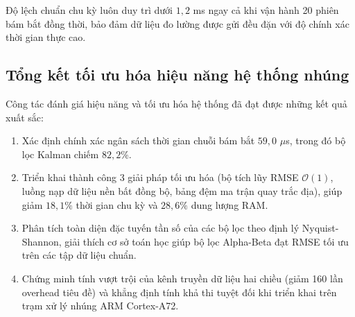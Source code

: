 \begin{table}[H]
\centering
\caption{Đo đạc độ chính xác chu kỳ trích mẫu 10 Hz và độ giật thời gian (Jitter) trên máy chủ kiểm thử}
\label{tab:event-loop-jitter-benchmark-w12}
\end{table}

Độ lệch chuẩn chu kỳ luôn duy trì dưới $1{,}2$ ms ngay cả khi vận hành 20 phiên bám bắt đồng thời, bảo đảm dữ liệu đo lường được gửi đều đặn với độ chính xác thời gian thực cao.

\subsection{Tổng kết tối ưu hóa hiệu năng hệ thống nhúng}

\hspace{0.5cm} Công tác đánh giá hiệu năng và tối ưu hóa hệ thống đã đạt được những kết quả xuất sắc:
\begin{enumerate}
    \item Xác định chính xác ngân sách thời gian chuỗi bám bắt $59{,}0$ $\mu$s, trong đó bộ lọc Kalman chiếm $82{,}2\%$.
    \item Triển khai thành công 3 giải pháp tối ưu hóa (bộ tích lũy RMSE $\mathcal{O}(1)$, luồng nạp dữ liệu nền bất đồng bộ, bảng đệm ma trận quay trắc địa), giúp giảm $18{,}1\%$ thời gian chu kỳ và $28{,}6\%$ dung lượng RAM.
    \item Phân tích toàn diện đặc tuyến tần số của các bộ lọc theo định lý Nyquist-Shannon, giải thích cơ sở toán học giúp bộ lọc Alpha-Beta đạt RMSE tối ưu trên các tập dữ liệu chuẩn.
    \item Chứng minh tính vượt trội của kênh truyền dữ liệu hai chiều (giảm 160 lần overhead tiêu đề) và khẳng định tính khả thi tuyệt đối khi triển khai trên trạm xử lý nhúng ARM Cortex-A72.
\end{enumerate}
